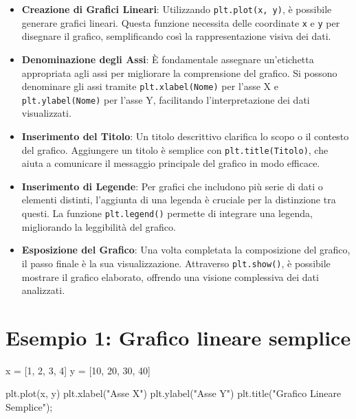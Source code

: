 \documentclass[
  letterpaper,
  krantz2]{{[}./krantz{]}}
\newenvironment{Shaded}{\begin{snugshade}}{\end{snugshade}}
\newcommand{\DecValTok}[1]{\textcolor[rgb]{0.68,0.00,0.00}{#1}}
\newcommand{\NormalTok}[1]{\textcolor[rgb]{0.00,0.23,0.31}{#1}}
\newcommand{\OperatorTok}[1]{\textcolor[rgb]{0.37,0.37,0.37}{#1}}
\newcommand{\StringTok}[1]{\textcolor[rgb]{0.13,0.47,0.30}{#1}}
\begin{document}
\begin{itemize}
\item
  \textbf{Creazione di Grafici Lineari}: Utilizzando
  \texttt{plt.plot(x,\ y)}, è possibile generare grafici lineari. Questa
  funzione necessita delle coordinate \texttt{x} e \texttt{y} per
  disegnare il grafico, semplificando così la rappresentazione visiva
  dei dati.
\item
  \textbf{Denominazione degli Assi}: È fondamentale assegnare
  un'etichetta appropriata agli assi per migliorare la comprensione del
  grafico. Si possono denominare gli assi tramite
  \texttt{plt.xlabel(\textquotesingle{}Nome\textquotesingle{})} per
  l'asse X e
  \texttt{plt.ylabel(\textquotesingle{}Nome\textquotesingle{})} per
  l'asse Y, facilitando l'interpretazione dei dati visualizzati.
\item
  \textbf{Inserimento del Titolo}: Un titolo descrittivo clarifica lo
  scopo o il contesto del grafico. Aggiungere un titolo è semplice con
  \texttt{plt.title(\textquotesingle{}Titolo\textquotesingle{})}, che
  aiuta a comunicare il messaggio principale del grafico in modo
  efficace.
\item
  \textbf{Inserimento di Legende}: Per grafici che includono più serie
  di dati o elementi distinti, l'aggiunta di una legenda è cruciale per
  la distinzione tra questi. La funzione \texttt{plt.legend()} permette
  di integrare una legenda, migliorando la leggibilità del grafico.
\item
  \textbf{Esposizione del Grafico}: Una volta completata la composizione
  del grafico, il passo finale è la sua visualizzazione. Attraverso
  \texttt{plt.show()}, è possibile mostrare il grafico elaborato,
  offrendo una visione complessiva dei dati analizzati.
\end{itemize}

\section{Esempio 1: Grafico lineare
semplice}\label{esempio-1-grafico-lineare-semplice}

\begin{Shaded}
\begin{Highlighting}[]
\NormalTok{x }\OperatorTok{=}\NormalTok{ [}\DecValTok{1}\NormalTok{, }\DecValTok{2}\NormalTok{, }\DecValTok{3}\NormalTok{, }\DecValTok{4}\NormalTok{]}
\NormalTok{y }\OperatorTok{=}\NormalTok{ [}\DecValTok{10}\NormalTok{, }\DecValTok{20}\NormalTok{, }\DecValTok{30}\NormalTok{, }\DecValTok{40}\NormalTok{]}

\NormalTok{plt.plot(x, y)}
\NormalTok{plt.xlabel(}\StringTok{"Asse X"}\NormalTok{)}
\NormalTok{plt.ylabel(}\StringTok{"Asse Y"}\NormalTok{)}
\NormalTok{plt.title(}\StringTok{"Grafico Lineare Semplice"}\NormalTok{)}\OperatorTok{;}
\end{Highlighting}
\end{Shaded}
\end{document}
